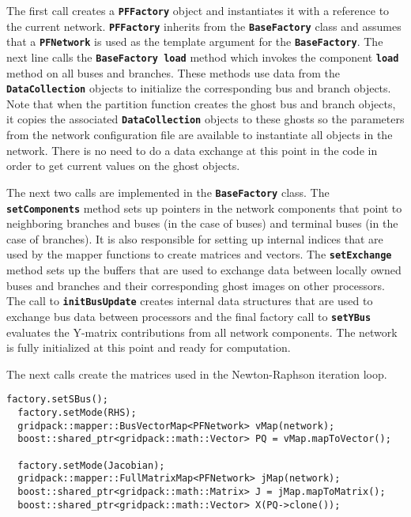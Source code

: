 The first call creates a \texttt{\textbf{PFFactory}} object and instantiates it
with a reference to the current network. \texttt{\textbf{PFFactory}} inherits
from the \texttt{\textbf{BaseFactory}} class and assumes that a
\texttt{\textbf{PFNetwork}} is used as the template argument for the
\texttt{\textbf{BaseFactory}}. The next line calls the
\texttt{\textbf{BaseFactory load}} method which invokes the component
\texttt{\textbf{load}} method on all buses and branches. These methods use data from the \texttt{\textbf{DataCollection}} objects to initialize the corresponding bus and branch objects. Note that when the partition function creates the ghost bus and branch objects, it copies the associated \texttt{\textbf{DataCollection}} objects to these ghosts so the parameters from the network configuration file are available to instantiate all objects in the network. There is no need to do a data exchange at this point in the code in order to get current values on the ghost objects.

The next two calls are implemented in the \texttt{\textbf{BaseFactory}} class. The \texttt{\textbf{setComponents}} method sets up pointers in the network components that point to neighboring branches and buses (in the case of buses) and terminal buses (in the case of branches). It is also responsible for setting up internal indices that are used by the mapper functions to create matrices and vectors. The \texttt{\textbf{setExchange}} method sets up the buffers that are used to exchange data between locally owned buses and branches and their corresponding ghost images on other processors. The call to \texttt{\textbf{initBusUpdate}} creates internal data structures that are used to exchange bus data between processors and the final factory call to \texttt{\textbf{setYBus}} evaluates the Y-matrix contributions from all network components. The network is fully initialized at this point and ready for computation.

The next calls create the matrices used in the Newton-Raphson iteration loop.

{
\color{red}
\begin{Verbatim}[fontseries=b]
  factory.setSBus();
  factory.setMode(RHS);
  gridpack::mapper::BusVectorMap<PFNetwork> vMap(network);
  boost::shared_ptr<gridpack::math::Vector> PQ = vMap.mapToVector();

  factory.setMode(Jacobian);
  gridpack::mapper::FullMatrixMap<PFNetwork> jMap(network);
  boost::shared_ptr<gridpack::math::Matrix> J = jMap.mapToMatrix();
  boost::shared_ptr<gridpack::math::Vector> X(PQ->clone());
\end{Verbatim}
}

